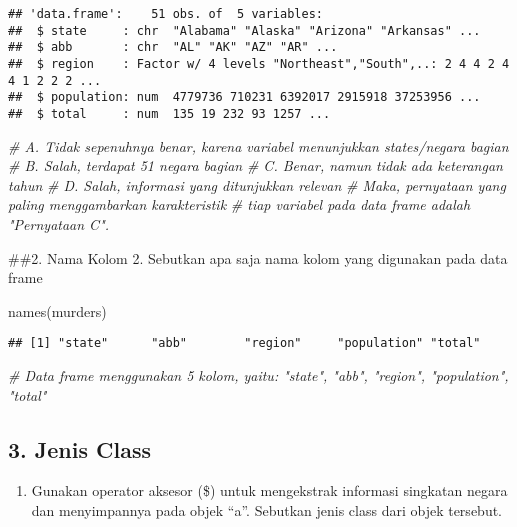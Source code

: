 \documentclass[
]{article}
\newenvironment{Shaded}{\begin{snugshade}}{\end{snugshade}}
\newcommand{\CommentTok}[1]{\textcolor[rgb]{0.56,0.35,0.01}{\textit{#1}}}
\newcommand{\FunctionTok}[1]{\textcolor[rgb]{0.00,0.00,0.00}{#1}}
\newcommand{\NormalTok}[1]{#1}
\providecommand{\tightlist}{%
  \setlength{\itemsep}{0pt}\setlength{\parskip}{0pt}}
\begin{document}
\begin{verbatim}
## 'data.frame':    51 obs. of  5 variables:
##  $ state     : chr  "Alabama" "Alaska" "Arizona" "Arkansas" ...
##  $ abb       : chr  "AL" "AK" "AZ" "AR" ...
##  $ region    : Factor w/ 4 levels "Northeast","South",..: 2 4 4 2 4 4 1 2 2 2 ...
##  $ population: num  4779736 710231 6392017 2915918 37253956 ...
##  $ total     : num  135 19 232 93 1257 ...
\end{verbatim}

\begin{Shaded}
\begin{Highlighting}[]
  \CommentTok{\# A. Tidak sepenuhnya benar, karena variabel menunjukkan states/negara bagian}
  \CommentTok{\# B. Salah, terdapat 51 negara bagian}
  \CommentTok{\# C. Benar, namun tidak ada keterangan tahun}
  \CommentTok{\# D. Salah, informasi yang ditunjukkan relevan}
  \CommentTok{\# Maka, pernyataan yang paling menggambarkan karakteristik}
  \CommentTok{\# tiap variabel pada data frame adalah "Pernyataan C".}
\end{Highlighting}
\end{Shaded}

\#\#2. Nama Kolom 2. Sebutkan apa saja nama kolom yang digunakan pada
data frame

\begin{Shaded}
\begin{Highlighting}[]
\FunctionTok{names}\NormalTok{(murders)}
\end{Highlighting}
\end{Shaded}

\begin{verbatim}
## [1] "state"      "abb"        "region"     "population" "total"
\end{verbatim}

\begin{Shaded}
\begin{Highlighting}[]
  \CommentTok{\# Data frame menggunakan 5 kolom, yaitu: "state", "abb", "region", "population", "total" }
\end{Highlighting}
\end{Shaded}

\hypertarget{jenis-class}{%
\subsection{3. Jenis Class}\label{jenis-class}}

\begin{enumerate}
\def\labelenumi{\arabic{enumi}.}
\setcounter{enumi}{2}
\tightlist
\item
  Gunakan operator aksesor (\$) untuk mengekstrak informasi singkatan
  negara dan menyimpannya pada objek ``a''. Sebutkan jenis class dari
  objek tersebut.
\end{enumerate}
\end{document}
